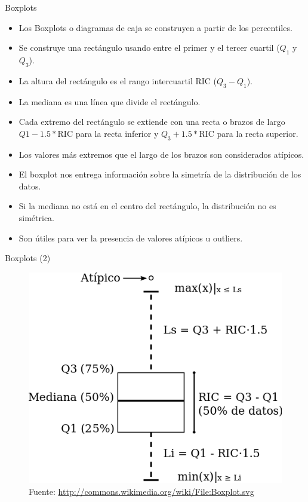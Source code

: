 \documentclass[handout]{beamer}
\begin{document}
\begin{frame}[fragile]{Boxplots}
\scriptsize{
\begin{itemize}
 \item Los Boxplots o diagramas de caja se construyen a partir de los percentiles. 
 \item Se construye una rectángulo usando entre el primer y el tercer cuartil ($Q_1$ y $Q_3$).
 \item La altura del rectángulo es el rango intercuartil RIC ($Q_3 - Q_1$).
 \item La mediana es una línea que divide el rectángulo.
 \item Cada extremo del rectángulo se extiende con una recta o brazos de largo $Q1-1.5*$RIC para la recta inferior y  $Q_3+1.5*$RIC para la recta superior.
 \item Los valores más extremos que el largo de los brazos son considerados atípicos.
 
 \item El boxplot nos entrega información sobre la simetría de la distribución de los datos.
  \item Si la mediana no está en el centro del rectángulo, la distribución no es simétrica.
 \item Son útiles para ver la presencia de valores atípicos u outliers.
 
\end{itemize}



}
\end{frame}


\begin{frame}{Boxplots (2)}
\begin{figure}[h!]
	\centering
	\includegraphics[scale=0.35]{imagenes/boxplot.png}
	\caption{Fuente: \url{http://commons.wikimedia.org/wiki/File:Boxplot.svg}}
	
\end{figure} 
\end{frame}
\end{document}
